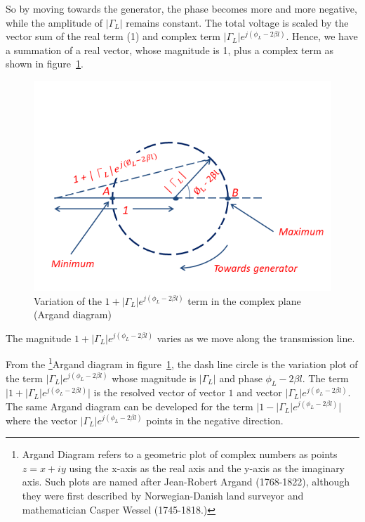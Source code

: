 So by moving towards the generator, the phase becomes more and more negative, while the amplitude of $|\Gamma_L|$ remains constant. The total voltage is scaled by the vector sum of the real term (1) and complex term $|\Gamma_L| e^{j(\phi_L -2 \beta l)}$. Hence, we have a summation of a real vector, whose magnitude is 1, plus a complex term as shown in figure~\ref{fig:kjhgfdwert}. 
\begin{figure}[h]
\centering
\includegraphics[width=1\linewidth]{./graphics/Argand_Diagram}
\caption{Variation of the $1 + |\Gamma_L| e^{j(\phi_L -2 \beta l)}$ term in the complex plane (Argand diagram)}
\label{fig:kjhgfdwert}
\end{figure}

The magnitude $1+|\Gamma_L| e^{j(\phi_L -2 \beta l)}$ varies as we move along the transmission line.

From the \footnote{
Argand Diagram refers to a geometric plot of complex numbers as points $z = x + iy$ using the x-axis as the real axis and the y-axis as the imaginary axis. Such plots are named after Jean-Robert Argand (1768-1822), although they were first described by Norwegian-Danish land surveyor and mathematician Casper Wessel (1745-1818.)
}Argand diagram in figure~\ref{fig:kjhgfdwert}, the dash line circle is the variation plot of the term $\lvert\Gamma_L\rvert e^{j (\phi_L - 2\beta l)}$ whose magnitude is $\lvert \Gamma_L\rvert$ and phase $\phi_L - 2 \beta l$. The term $\lvert 1 + \lvert\Gamma_L\rvert e^{j (\phi_L - 2\beta l)}\rvert$ is the resolved vector of vector $1$ and vector $\lvert\Gamma_L\rvert e^{j (\phi_L - 2\beta l)}$. The same Argand diagram can be developed for the term $\lvert1 - \lvert\Gamma_L\rvert e^{j (\phi_L - 2\beta l)}\rvert$ where the vector $\lvert\Gamma_L\rvert e^{j (\phi_L - 2\beta l)}$ points in the negative direction. 

